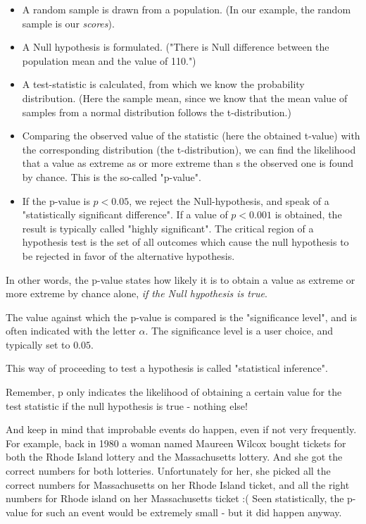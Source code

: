 \begin{itemize}
  \item A random sample is drawn from a population. (In our example, the random sample is our \emph{scores}).
  \item A Null hypothesis is formulated. ("There is Null difference between the population mean and the value of 110.")
  \item A test-statistic is calculated, from which we know the probability distribution. (Here the sample mean, since we know that the mean value of samples from a normal distribution follows the t-distribution.)
  \item Comparing the observed value of the statistic (here the obtained t-value) with the corresponding distribution (the t-distribution), we can find the likelihood that a value as extreme as or more extreme than s the observed one is found by chance. This is the so-called "p-value".
  \item If the p-value is $p<0.05$, we reject the Null-hypothesis, and speak of a "statistically significant difference". If a value of $p<0.001$ is obtained, the result is typically called "highly significant". The critical region of a hypothesis test is the set of all outcomes which cause the null hypothesis to be rejected in favor of the alternative hypothesis.
\end{itemize}

In other words, the p-value states how likely it is to obtain a value as extreme or more extreme by chance alone, \emph{if the Null hypothesis is true}.

The value against which the p-value is compared is the "significance level", and is often indicated with the letter $\alpha$. The significance level is a user choice, and typically set to $0.05$.

This way of proceeding to test a hypothesis is called "statistical inference".

Remember, p only indicates the likelihood of obtaining a certain value for the test statistic if the null hypothesis is true - nothing else!

And keep in mind that improbable events do happen, even if not very frequently. For example, back in 1980 a woman named Maureen Wilcox bought tickets for both the Rhode Island lottery and the Massachusetts lottery. And she got the correct numbers for both lotteries. Unfortunately for her, she picked all the correct numbers for Massachusetts on her Rhode Island ticket, and all the  right numbers for Rhode island on her Massachusetts ticket :(  Seen statistically, the p-value for such an event would be extremely small - but it did happen anyway.


